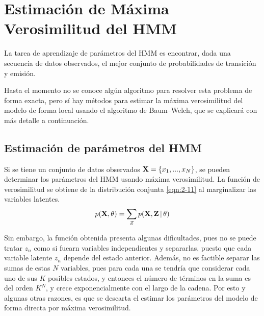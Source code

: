 
\section{Estimación de Máxima Verosimilitud del HMM} \label{ch:chap3}

La tarea de aprendizaje de parámetros del HMM es encontrar, dada una secuencia de datos observados, el mejor conjunto de probabilidades de transición y emisión.

Hasta el momento no se conoce algún algoritmo para resolver esta problema de forma exacta, pero sí hay métodos para estimar la máxima verosimilitud del modelo de forma local usando el algoritmo de Baum–Welch, que se explicará con más detalle a continuación.

\subsection{Estimación de parámetros del HMM}

Si se tiene un conjunto de datos observados $\textbf{X} = \lbrace x_1, ..., x_N \rbrace$, se pueden determinar los parámetros del HMM usando máxima verosimilitud. La función de verosimilitud se obtiene de la distribución conjunta \eqref{eqn:2-11} al marginalizar las variables latentes.
\begin{equation}
  p(\textbf{X}, \theta) = \sum_Z p(\textbf{X}, \textbf{Z} \,|\, \theta)
\label{eqn:3-1}
\end{equation}

Sin embargo, la función obtenida presenta algunas dificultades, pues no se puede tratar $z_n$ como si fuearn variables independientes y separarlas, puesto que cada variable latente $z_n$ depende del estado anterior. Además, no es factible separar las sumas de estas $N$ variables, pues para cada una se tendría que considerar cada uno de sus $K$ posibles estados, y entonces el número de términos en la suma es del orden $K^N$, y crece exponencialmente con el largo de la cadena. Por esto y algunas otras razones, es que se descarta el estimar los parámetros del modelo de forma directa por máxima verosimilitud.

